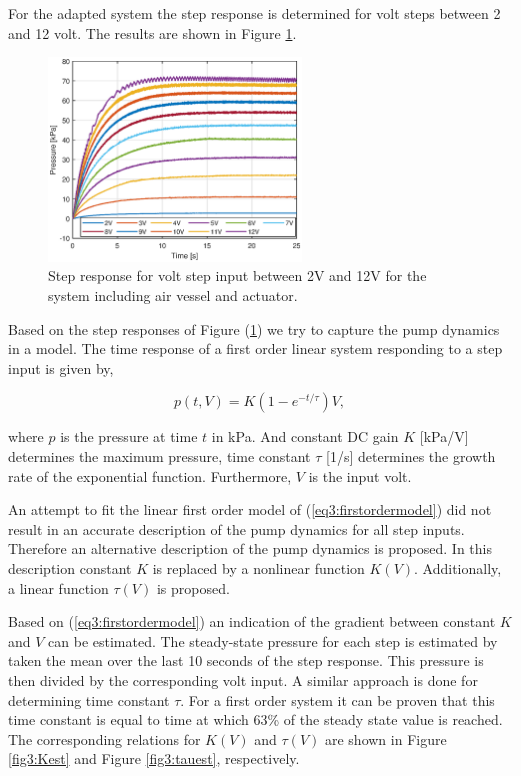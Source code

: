 For the adapted system the step response is determined for volt steps between 2 and 12 volt. The results are shown in Figure \ref{fig3:pump_dynamics_adapted}.

\begin{figure}[H]
    \centering
    \includegraphics[width = 0.6\textwidth]{Figures/Chapter3/step212V.eps}
    \caption{Step response for volt step input between 2V and 12V for the system including air vessel and actuator.}
    \label{fig3:pump_dynamics_adapted}
\end{figure}


Based on the step responses of Figure (\ref{fig3:pump_dynamics_adapted}) we try to capture the pump dynamics in a model. The time response of a first order linear system responding to a step input is given by, 

\begin{equation}
    p(t,V) = K(1-e^{-t/\tau})V,
    \label{eq3:firstordermodel}
\end{equation}

where $p$ is the pressure at time $t$ in kPa. And constant DC gain $K$ [kPa/V] determines the maximum pressure, time constant $\tau$ [1/s] determines the growth rate of the exponential function. Furthermore, $V$ is the input volt. 

An attempt to fit the linear first order model of (\ref{eq3:firstordermodel}) did not result in an accurate description of the pump dynamics for all step inputs. Therefore an alternative description of the pump dynamics is proposed. In this description constant $K$ is replaced by a nonlinear function $K(V)$. Additionally, a linear function $\tau(V)$ is proposed. 

Based on (\ref{eq3:firstordermodel}) an indication of the gradient between constant $K$ and $V$ can be estimated. The steady-state pressure for each step is estimated by taken the mean over the last 10 seconds of the step response. This pressure is then divided by the corresponding volt input. A similar approach is done for determining time constant $\tau$. For a first order system it can be proven that this time constant is equal to time at which 63\% of the steady state value is reached. The corresponding relations for $K(V)$ and $\tau(V)$ are shown in Figure \ref{fig3:Kest} and Figure \ref{fig3:tauest}, respectively.

